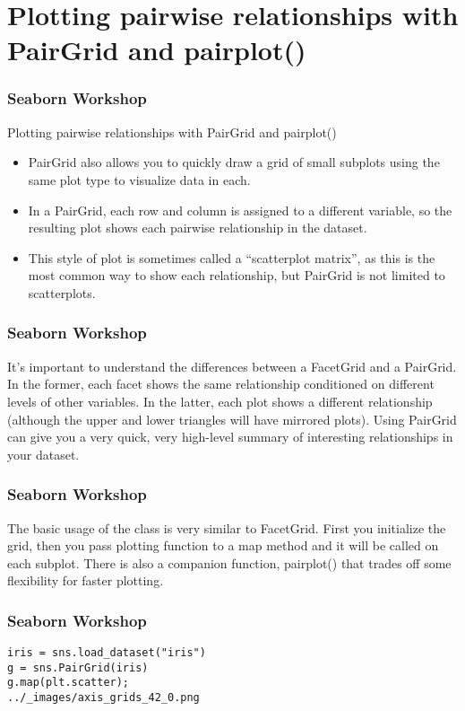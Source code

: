 \documentclass{beamer}
\begin{document}
\section{Plotting pairwise relationships with PairGrid and pairplot()}
\begin{frame}[fragile]
\frametitle{Seaborn Workshop}
\large
Plotting pairwise relationships with PairGrid and pairplot()
\begin{itemize}
\item PairGrid also allows you to quickly draw a grid of small subplots using the same plot type to visualize data in each. 
\item In a PairGrid, each row and column is assigned to a different variable, so the resulting plot shows each pairwise relationship in the dataset. 
\item This style of plot is sometimes called a “scatterplot matrix”, as this is the most common way to show each relationship, but PairGrid is not limited to scatterplots.
\end{itemize}
\end{frame}
\begin{frame}[fragile]
\frametitle{Seaborn Workshop}
\large

It’s important to understand the differences between a FacetGrid and a PairGrid. In the former, each facet shows the same relationship conditioned on different levels of other variables. In the latter, each plot shows a different relationship (although the upper and lower triangles will have mirrored plots). Using PairGrid can give you a very quick, very high-level summary of interesting relationships in your dataset.
\end{frame}
\begin{frame}[fragile]
	\frametitle{Seaborn Workshop}
	\large
The basic usage of the class is very similar to FacetGrid. First you initialize the grid, then you pass plotting function to a map method and it will be called on each subplot. There is also a companion function, pairplot() that trades off some flexibility for faster plotting.
\end{frame}
\begin{frame}[fragile]
\frametitle{Seaborn Workshop}
\large
\begin{framed}
	\begin{verbatim}
iris = sns.load_dataset("iris")
g = sns.PairGrid(iris)
g.map(plt.scatter);
../_images/axis_grids_42_0.png
\end{verbatim}
\end{framed}
\end{frame}
\end{document}
